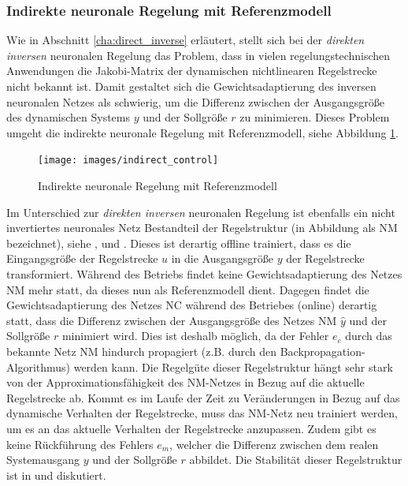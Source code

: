 \subsubsection{Indirekte neuronale Regelung mit Referenzmodell}

Wie in Abschnitt \ref{cha:direct_inverse} erläutert, stellt sich bei der \textit{direkten inversen} neuronalen Regelung das Problem, dass in vielen regelungstechnischen Anwendungen die Jakobi-Matrix der dynamischen nichtlinearen Regelstrecke nicht bekannt ist. Damit gestaltet sich die Gewichtsadaptierung des inversen neuronalen Netzes als schwierig, um die Differenz zwischen der Ausgangsgröße des dynamischen Systems $y$ und der Sollgröße $r$ zu minimieren. Dieses Problem umgeht die indirekte neuronale Regelung mit Referenzmodell, siehe Abbildung \ref{fig:indirect_control}.


\begin{figure} [h]
	\centering
	\texttt{[image: images/indirect\_control]}
	\caption{Indirekte neuronale Regelung mit Referenzmodell \cite{Sklyarenko.2002}}
	\label{fig:indirect_control}
\end{figure}

Im Unterschied zur \textit{direkten inversen} neuronalen Regelung ist ebenfalls ein nicht invertiertes neuronales Netz Bestandteil der Regelstruktur (in Abbildung als NM bezeichnet), siehe \cite{Nguyen.1990}, \cite{BenNasr.2014} und \cite{HUSSAIN.1999}. Dieses ist derartig offline trainiert, dass es die Eingangsgröße der Regelstrecke $u$ in die  Ausgangsgröße $y$ der Regelstrecke transformiert. Während des Betriebs findet keine Gewichtsadaptierung des Netzes NM mehr statt, da dieses nun als Referenzmodell dient. Dagegen findet die Gewichtsadaptierung des Netzes NC während des Betriebes (online) derartig statt, dass die Differenz zwischen der Ausgangsgröße des Netzes NM $\hat{y}$ und der Sollgröße $r$ minimiert wird. Dies ist deshalb möglich, da der Fehler $e_c$ durch das bekannte Netz NM hindurch propagiert (z.B. durch den Backpropagation-Algorithmus) werden kann. Die Regelgüte dieser Regelstruktur hängt sehr stark von der Approximationsfähigkeit des NM-Netzes in Bezug auf die aktuelle Regelstrecke ab. Kommt es im Laufe der Zeit zu Veränderungen in Bezug auf das dynamische Verhalten der Regelstrecke, muss das NM-Netz neu trainiert werden, um es an das aktuelle Verhalten der Regelstrecke anzupassen.  Zudem gibt es keine Rückführung des Fehlers $e_m$, welcher die Differenz zwischen dem realen Systemausgang $y$ und der Sollgröße $r$ abbildet. Die Stabilität dieser Regelstruktur ist in \cite{VijayaKumar.2009} und \cite{Ruan.2007} diskutiert.
 

